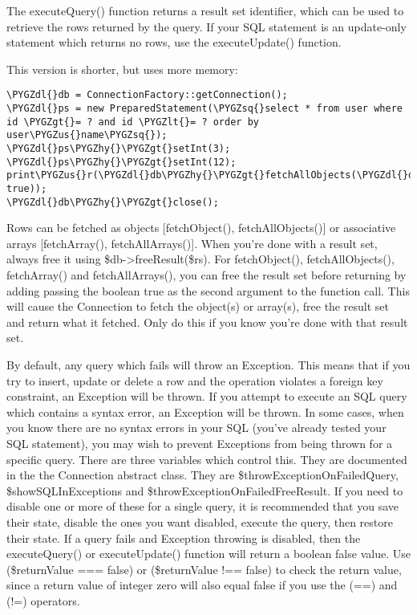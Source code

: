 \documentclass[letterpaper,10pt,english]{sphinxmanual}
\def\PYGZus{\char`\_}
\def\PYGZlt{\char`\<}
\def\PYGZgt{\char`\>}
\def\PYGZdl{\char`\$}
\def\PYGZhy{\char`\-}
\def\PYGZsq{\char`\'}
\renewcommand\PYGZsq{\textquotesingle}
\begin{document}
The executeQuery() function returns a result set identifier, which can be used to retrieve the rows
returned by the query.  If your SQL statement is an update-only statement which returns no rows, use
the executeUpdate() function.

This version is shorter, but uses more memory:

\begin{Verbatim}[commandchars=\\\{\}]
\PYGZdl{}db = ConnectionFactory::getConnection();
\PYGZdl{}ps = new PreparedStatement(\PYGZsq{}select * from user where id \PYGZgt{}= ? and id \PYGZlt{}= ? order by user\PYGZus{}name\PYGZsq{});
\PYGZdl{}ps\PYGZhy{}\PYGZgt{}setInt(3);
\PYGZdl{}ps\PYGZhy{}\PYGZgt{}setInt(12);
print\PYGZus{}r(\PYGZdl{}db\PYGZhy{}\PYGZgt{}fetchAllObjects(\PYGZdl{}db\PYGZhy{}\PYGZgt{}executeQuery(\PYGZdl{}ps), true));
\PYGZdl{}db\PYGZhy{}\PYGZgt{}close();
\end{Verbatim}

Rows can be fetched as objects {[}fetchObject(), fetchAllObjects(){]} or associative arrays
{[}fetchArray(), fetchAllArrays(){]}.  When you're done with a result set, always free it using
\$db-\textgreater{}freeResult(\$rs).  For fetchObject(), fetchAllObjects(), fetchArray() and fetchAllArrays(), you
can free the result set before returning by adding passing the boolean true as the second argument
to the function call.  This will cause the Connection to fetch the object(s) or array(s), free the
result set and return what it fetched.  Only do this if you know you're done with that result set.

By default, any query which fails will throw an Exception.  This means that if you try to insert,
update or delete a row and the operation violates a foreign key constraint, an Exception will be
thrown.  If you attempt to execute an SQL query which contains a syntax error, an Exception will be
thrown.  In some cases, when you know there are no syntax errors in your SQL (you've already tested
your SQL statement), you may wish to prevent Exceptions from being thrown for a specific query.
There are three variables which control this.  They are documented in the the Connection abstract
class.  They are \$throwExceptionOnFailedQuery, \$showSQLInExceptions and
\$throwExceptionOnFailedFreeResult.  If you need to disable one or more of these for a single query,
it is recommended that you save their state, disable the ones you want disabled, execute the query,
then restore their state.  If a query fails and Exception throwing is disabled, then the
executeQuery() or executeUpdate() function will return a boolean false value.  Use (\$returnValue ===
false) or (\$returnValue !== false) to check the return value, since a return value of integer zero
will also equal false if you use the (==) and (!=) operators.
\end{document}
